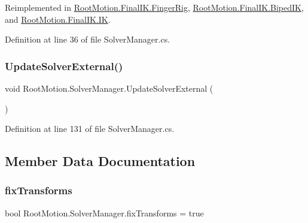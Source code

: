 Reimplemented in \mbox{\hyperlink{class_root_motion_1_1_final_i_k_1_1_finger_rig_a17665e6e48b665fffb30dfd90f270fca}{Root\+Motion.\+Final\+I\+K.\+Finger\+Rig}}, \mbox{\hyperlink{class_root_motion_1_1_final_i_k_1_1_biped_i_k_a75e17e27c32670ddad2172f03e245632}{Root\+Motion.\+Final\+I\+K.\+Biped\+IK}}, and \mbox{\hyperlink{class_root_motion_1_1_final_i_k_1_1_i_k_adec5648de6e1fc9fcbc2de325fc654a2}{Root\+Motion.\+Final\+I\+K.\+IK}}.



Definition at line 36 of file Solver\+Manager.\+cs.

\mbox{\label{class_root_motion_1_1_solver_manager_acabe00dc2ad2b2b805db7ddd3a6c0ed8}} 
\subsubsection{\texorpdfstring{Update\+Solver\+External()}{UpdateSolverExternal()}}
{\footnotesize\ttfamily void Root\+Motion.\+Solver\+Manager.\+Update\+Solver\+External (\begin{DoxyParamCaption}{ }\end{DoxyParamCaption})}



Definition at line 131 of file Solver\+Manager.\+cs.



\subsection{Member Data Documentation}
\mbox{\label{class_root_motion_1_1_solver_manager_a59c1ad381bba471b13398f8090db6e1a}} 
\subsubsection{\texorpdfstring{fix\+Transforms}{fixTransforms}}
{\footnotesize\ttfamily bool Root\+Motion.\+Solver\+Manager.\+fix\+Transforms = true}



